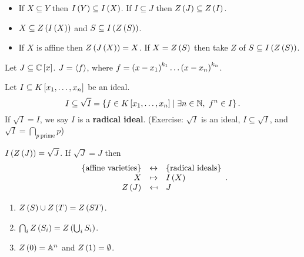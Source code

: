 \begin{proposition}
\hfill
\begin{itemize}
\item If $ X \subseteq Y $ then $ I\rb{Y} \subseteq I\rb{X} $. If $ I \subseteq J $ then $ Z\rb{J} \subseteq Z\rb{I} $.
\item $ X \subseteq Z\rb{I\rb{X}} $ and $ S \subseteq I\rb{Z\rb{S}} $.
\item If $ X $ is affine then $ Z\rb{J\rb{X}} = X $. If $ X = Z\rb{S} $ then take $ Z $ of $ S \subseteq I\rb{Z\rb{S}} $.
\end{itemize}
\end{proposition}

\begin{example}
Let $ J \subseteq \C\sb{x} $. $ J = \ab{f} $, where $ f = \rb{x - x_1}^{k_1} \dots \rb{x - x_n}^{k_n} $.
\end{example}

\begin{definition}
Let $ I \subseteq K\sb{x_1, \dots, x_n} $ be an ideal.
$$ I \subseteq \sqrt{I} = \cb{f \in K\sb{x_1, \dots, x_n} \mid \exists n \in \N, \ f^n \in I}. $$
If $ \sqrt{I} = I $, we say $ I $ is a \textbf{radical ideal}. (Exercise: $ \sqrt{I} $ is an ideal, $ I \subseteq \sqrt{I} $, and $ \sqrt{I} = \bigcap_{p \ \text{prime}} p $)
\end{definition}

\begin{theorem}
$ I\rb{Z\rb{J}} = \sqrt{J} $. If $ \sqrt{J} = J $ then
$$
\begin{array}{rcl}
\cb{\text{affine varieties}} & \leftrightarrow & \cb{\text{radical ideals}} \\
X & \mapsto & I\rb{X} \\
Z\rb{J} & \mapsfrom & J
\end{array}.
$$
\end{theorem}


\begin{proposition}
\hfill
\begin{enumerate}
\item $ Z\rb{S} \cup Z\rb{T} = Z\rb{ST} $.
\item $ \bigcap_i Z\rb{S_i} = Z\rb{\bigcup_i S_i} $.
\item $ Z\rb{0} = \A^n $ and $ Z\rb{1} = \emptyset $.
\end{enumerate}
\end{proposition}


